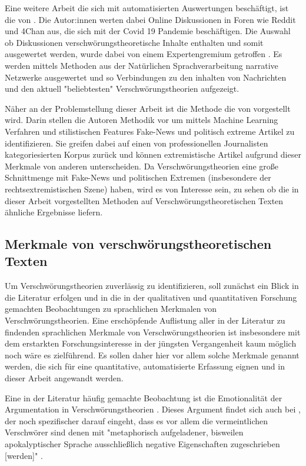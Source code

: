 Eine weitere Arbeit die sich mit automatisierten Auswertungen beschäftigt, ist die von \textcite{shahsavari_2020}.
Die Autor:innen werten dabei Online Diskussionen in Foren wie Reddit und 4Chan aus, die sich mit der Covid 19 Pandemie beschäftigen.
Die Auswahl ob Diskussionen verschwörungstheoretische Inhalte enthalten und somit ausgewertet werden, wurde dabei von einem Expertengremium getroffen \parencite[284f]{shahsavari_2020}.
Es werden mittels Methoden aus der Natürlichen Sprachverarbeitung narrative Netzwerke ausgewertet und so Verbindungen zu den inhalten von Nachrichten und den aktuell "beliebtesten" Verschwörungstheorien aufgezeigt.

Näher an der Problemstellung dieser Arbeit ist die Methode die von \textcite{potthast_2018} vorgestellt wird.
Darin stellen die Autoren Methodik vor um mittels Machine Learning Verfahren und stilistischen Features Fake-News und politisch extreme Artikel zu identifizieren.
Sie greifen dabei auf einen von professionellen Journalisten kategoriesierten Korpus zurück und können extremistische Artikel aufgrund dieser Merkmale von anderen unterscheiden.
Da Verschwörungstheorien eine große Schnittmenge mit Fake-News und politischen Extremen (insbesondere der rechtsextremistischen Szene) haben, wird es von Interesse sein, zu sehen ob die in dieser Arbeit vorgestellten Methoden auf Verschwörungstheoretischen Texten ähnliche Ergebnisse liefern.

\subsection{Merkmale von verschwörungstheoretischen Texten}

Um Verschwörungstheorien zuverlässig zu identifizieren, soll zunächst ein Blick in die Literatur erfolgen und in die in der qualitativen und quantitativen Forschung gemachten Beobachtungen zu sprachlichen Merkmalen von Verschwörungstheorien.
Eine erschöpfende Auflistung aller in der Literatur zu findenden sprachlichen Merkmale von Verschwörungstheorien ist insbesondere mit dem erstarkten Forschungsinteresse in der jüngsten Vergangenheit kaum möglich noch wäre es zielführend.
Es sollen daher hier vor allem solche Merkmale genannt werden, die sich für eine quantitative, automatisierte Erfassung eignen und in dieser Arbeit angewandt werden.

Eine in der Literatur häufig gemachte Beobachtung ist die Emotionalität der Argumentation in Verschwörungstheorien \parencite[Vgl.][10]{miller_2002}.
Dieses Argument findet sich auch bei \textcite[][93ff]{butter_2018}, der noch spezifischer darauf eingeht, dass es vor allem die vermeintlichen Verschwörer sind denen mit "metaphorisch aufgeladener, bisweilen apokalyptischer Sprache ausschließlich negative Eigenschaften zugeschrieben [werden]" \parencite[][93f]{butter_2018}.

